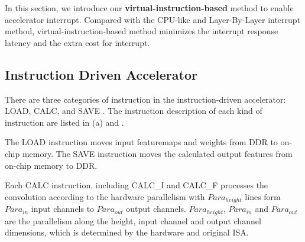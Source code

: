 \label{sec:cnninterrupt}





In this section, we introduce our \textbf{virtual-instruction-based} method to enable accelerator interrupt. Compared with the CPU-like and Layer-By-Layer interrupt method, virtual-instruction-based method minimizes the interrupt response latency and the extra cost for interrupt.

\subsection{ Instruction Driven Accelerator }

There are three categories of instruction in the instruction-driven accelerator: LOAD, CALC, and SAVE \cite{guo2017angel,qiu2016going,yu2018instruction}. The instruction description of each kind of instruction are listed in (a) and .

The LOAD instruction moves input featuremaps and weights from DDR to on-chip memory. The SAVE instruction moves the calculated output features from on-chip memory to DDR. 

Each CALC  instruction,  including CALC\_I and CALC\_F processes the convolution according to the hardware parallelism with $Para_{height}$ lines form $ Para_{in} $ input channels to $ Para_{out}$ output channels. $Para_{height}$, $ Para_{in} $ and $ Para_{out} $ are the parallelism along the height, input channel and output channel dimensions, which is determined by the hardware and original ISA.

